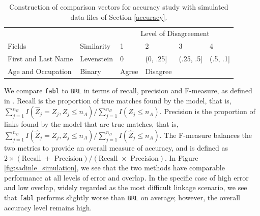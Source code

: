 \documentclass[ba]{imsart}
\begin{document}
	\begin{table}[t]
		\centering
		\begin{tabular}[t]{llllll}
			
			\multicolumn{2}{c}{ } & \multicolumn{4}{c}{Level of Disagreement} \\
			\cline{3-6}
			Fields & Similarity & 1 & 2 & 3 & 4\\
			\hline
			First and Last Name & Levenstein & 0 & (0, .25] & (.25, .5] & (.5, .1]\\
			Age and Occupation & Binary & Agree & Disagree &  & \\
			\hline
		\end{tabular}
		\caption{Construction of comparison vectors for accuracy study with simulated data files of Section \ref{accuracy}.}
		\label{Tab:sadinle_simulation_cutoffs}
	\end{table}
	
	We compare \texttt{fabl} to \texttt{BRL} in terms of recall, precision and F-measure, as defined in \cite{christen_2012}. Recall is the proportion of true matches found by the model, that is, $\sum_{j=1}^{n_B} I(\hat{Z}_j = Z_j, Z_j \leq n_A) / \sum_{j=1}^{n_B} I(Z_j \leq n_A)$. Precision is the proportion of links found by the model that are true matches, that is, $\sum_{j=1}^{n_B} I(\hat{Z}_j = Z_j, Z_j \leq n_A) / \sum_{j=1}^{n_B} I(\hat{Z}_j \leq n_A)$. The F-measure balances the two metrics to provide an overall measure of accuracy, and is defined as $2 \times (\text{Recall } + \text{ Precision}) / (\text{Recall } \times \text{ Precision})$. In Figure \ref{fig:sadinle_simulation}, we see that the two methods have comparable performance at all levels of error and overlap. In the specific case of high error and low overlap, widely regarded as the most difficult linkage scenario, we see that \texttt{fabl} performs slightly worse than \texttt{BRL} on average; however, the overall accuracy level remains high. 
	
\end{document}
